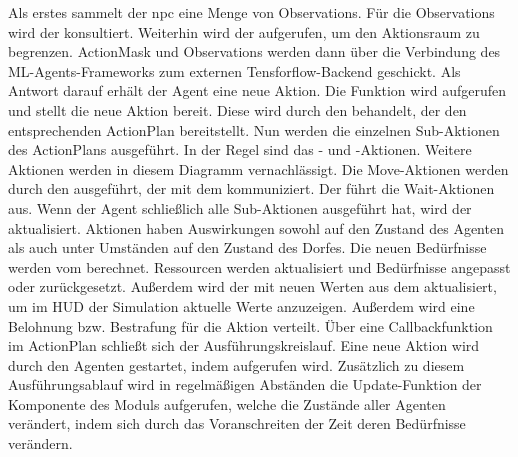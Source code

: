Als erstes sammelt der \ac{npc} eine Menge von Observations. Für die Observations wird der  konsultiert. Weiterhin wird der  aufgerufen, um den Aktionsraum zu begrenzen. ActionMask und Observations werden dann über die Verbindung des ML-Agents-Frameworks zum externen Tensforflow-Backend geschickt. Als Antwort darauf erhält der Agent eine neue Aktion. Die Funktion  wird aufgerufen und stellt die neue Aktion bereit. Diese wird durch den  behandelt, der den entsprechenden ActionPlan bereitstellt. Nun werden die einzelnen Sub-Aktionen des ActionPlans ausgeführt. In der Regel sind das - und -Aktionen. Weitere Aktionen werden in diesem Diagramm vernachlässigt. Die Move-Aktionen werden durch den  ausgeführt, der mit dem  kommuniziert. Der  führt die Wait-Aktionen aus.
Wenn der Agent schließlich alle Sub-Aktionen ausgeführt hat, wird der  aktualisiert. Aktionen haben Auswirkungen sowohl auf den Zustand des Agenten als auch unter Umständen auf den Zustand des Dorfes. Die neuen Bedürfnisse werden vom  berechnet. Ressourcen werden aktualisiert und Bedürfnisse angepasst oder zurückgesetzt. Außerdem wird der  mit neuen Werten aus dem  aktualisiert, um im HUD der Simulation aktuelle Werte anzuzeigen.
Außerdem wird eine Belohnung bzw. Bestrafung für die Aktion verteilt. Über eine Callbackfunktion im ActionPlan schließt sich der Ausführungskreislauf. Eine neue Aktion wird durch den Agenten gestartet, indem  aufgerufen wird.
Zusätzlich zu diesem Ausführungsablauf wird in regelmäßigen Abständen die Update-Funktion der Komponente  des Moduls  aufgerufen, welche die Zustände aller Agenten verändert, indem sich durch das Voranschreiten der Zeit deren Bedürfnisse verändern.











